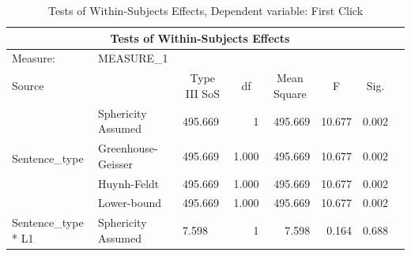 \documentclass[a4paper]{article}
\begin{document}
\begin{table}[H]
\centering
\caption{Tests of Within-Subjects Effects, Dependent variable: First Click}
\label{tab:withinfirstclick}
\begin{tabular}{p{}p{}|l|r|r|r|r|r|} 
\hline
\multicolumn{7}{|c|}{Tests of Within-Subjects Effects}                                                                                                                                                                                         \\ 
\hline
Measure:~                                               & MEASURE\_1         & \multicolumn{1}{l|}{}                        & \multicolumn{1}{l|}{}   & \multicolumn{1}{l|}{}            & \multicolumn{1}{l|}{}  & \multicolumn{1}{l|}{}      \\ 
\hline
Source                                                  & ~                  & \multicolumn{1}{c|}{Type III SoS} & \multicolumn{1}{c|}{df} & \multicolumn{1}{c|}{Mean Square} & \multicolumn{1}{c|}{F} & \multicolumn{1}{c|}{Sig.}  \\ 
\hline
\multirow{4}{*}{Sentence\_type}                         & Sphericity Assumed & 495.669                                      & 1                       & 495.669                          & 10.677                 & 0.002                      \\ 
\cline{2-7}
                                                        & Greenhouse-Geisser & 495.669                                      & 1.000                   & 495.669                          & 10.677                 & 0.002                      \\ 
\cline{2-7}
                                                        & Huynh-Feldt        & 495.669                                      & 1.000                   & 495.669                          & 10.677                 & 0.002                      \\ 
\cline{2-7}
                                                        & Lower-bound        & 495.669                                      & 1.000                   & 495.669                          & 10.677                 & 0.002                      \\ 
\hline
\multirow{4}{*}{Sentence\_type * L1}                    & Sphericity Assumed & 7.598                                        & 1                       & 7.598                            & 0.164                  & 0.688                      \\ 

\end{tabular}
\end{table}
\end{document}
